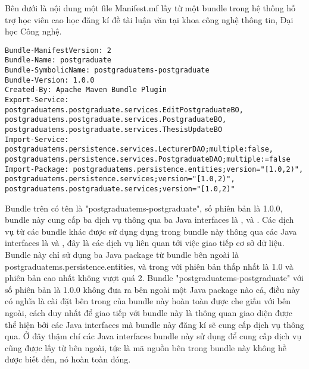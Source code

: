 Bên dưới là nội dung một file Manifest.mf lấy từ một bundle trong hệ thống hỗ trợ học viên cao học đăng kí đề tài luận văn tại khoa công nghệ thông tin, Đại học Công nghệ.
\begin{lstlisting}[label=manifest, 
inputencoding=utf8,
breaklines=true,
basicstyle=\ttfamily\footnotesize,
caption=Nội dung của môt file manifest của OSGi bundle]
Bundle-ManifestVersion: 2
Bundle-Name: postgraduate
Bundle-SymbolicName: postgraduatems-postgraduate
Bundle-Version: 1.0.0
Created-By: Apache Maven Bundle Plugin
Export-Service: postgraduatems.postgraduate.services.EditPostgraduateBO, postgraduatems.postgraduate.services.PostgraduateBO, postgraduatems.postgraduate.services.ThesisUpdateBO
Import-Service: postgraduatems.persistence.services.LecturerDAO;multiple:false, postgraduatems.persistence.services.PostgraduateDAO;multiple:=false
Import-Package: postgraduatems.persistence.entities;version="[1.0,2)", postgraduatems.persistence.services;version="[1.0,2)", postgraduatems.postgraduate.services;version="[1.0,2)"
\end{lstlisting}

Bundle trên có tên là "postgraduatems-postgraduate", số phiên bản là 1.0.0, bundle 
này cung cấp ba dịch vụ thông qua ba Java interfaces là , 
 và 
.
Các dịch vụ từ các bundle khác được sử dụng dụng trong bundle này thông qua các Java interfaces là  và 
, 
đây là các dịch vụ liên quan tới việc giao tiếp cơ sở dữ liệu.
Bundle này chỉ sử dụng ba Java package từ bundle bên ngoài là postgraduatems.persistence.entities,  và  trong với phiên bản thấp nhất là 1.0 và phiên bản cao nhất không vượt quá 2. Bundle "postgraduatems-postgraduate" với số phiên bản là 1.0.0 không đưa ra bên ngoài một Java package nào cả, điều này có nghĩa là cài đặt bên trong của bundle này hoàn toàn được che giấu với bên ngoài, cách duy nhất để giao tiếp với bundle này là thông quan giao diện được thể hiện bởi các Java interfaces mà bundle này đăng kí sẽ cung cấp dịch vụ thông qua. Ở đây thậm chí các Java interfaces bundle này sử dụng để cung cấp dịch vụ cũng được lấy từ bên ngoài, tức là mã nguồn bên trong bundle này không hề được biết đến, nó hoàn toàn đóng. 

